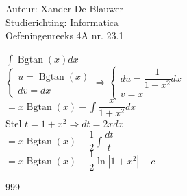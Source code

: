 \documentclass[a4paper]{article}
\begin{document}
\noindent \large Auteur: Xander De Blauwer \\
\noindent \large Studierichting: Informatica\\
\noindent \large Oefeningenreeks 4A nr. 23.1\\

\medskip

\normalsize

$\displaystyle\int \operatorname{Bgtan}(x)dx$\\

$\left \{
\begin{array}{l}
u = \operatorname{Bgtan}(x)  \\
dv = dx
\end{array}
\right .
\Rightarrow
\left \{
\begin{array}{l}
du = \dfrac{1}{1+x^2}dx \\
v = x
\end{array}
\right .$\\

$ = x\operatorname{Bgtan}(x) - \displaystyle\int \dfrac{x}{1+x^2}dx$ \\

Stel $t = 1 + x^2 \Rightarrow dt = 2xdx $ \\

$ = x\operatorname{Bgtan}(x) - \dfrac{1}{2}\displaystyle\int \dfrac{dt}{t}$ \\

$ = x\operatorname{Bgtan}(x) - \dfrac{1}{2}\ln|1+x^2| + c $





\begin{thebibliography}{999}
\end{thebibliography}
\end{document}
